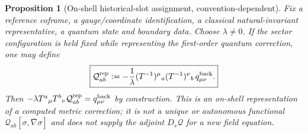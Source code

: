 \documentclass[11pt,a4paper]{article}
\newtheorem{proposition}[theorem]{Proposition}
\begin{document}
\begin{proposition}[On-shell historical-slot assignment, convention-dependent]\label{prop:qgd138-slot}
Fix a reference coframe, a gauge/coordinate identification, a classical
natural-invariant representative, a quantum state and boundary data.
Choose $\lambda\ne0$. If the sector configuration is held fixed while
representing the first-order quantum correction, one may define
\begin{equation}\label{eq:qgd138-slot}
 \boxed{\mathcal Q_{ab}^{\rm rep}:=-\frac1\lambda
 (T^{-1})^\mu{}_a(T^{-1})^\nu{}_b\,
 q_{\mu\nu}^{\rm back}.}
\end{equation}
Then $-\lambda T^a{}_{\mu}T^b{}_{\nu}
\mathcal Q_{ab}^{\rm rep}=q_{\mu\nu}^{\rm back}$ by construction.
This is an \emph{on-shell representation} of a computed metric
correction; it is not a unique or autonomous functional
$\mathcal Q_{ab}[\sigma,\bar\nabla\sigma]$ and does not
supply the adjoint $D_s\mathcal Q$ for a new field equation.
\end{proposition}
\end{document}
